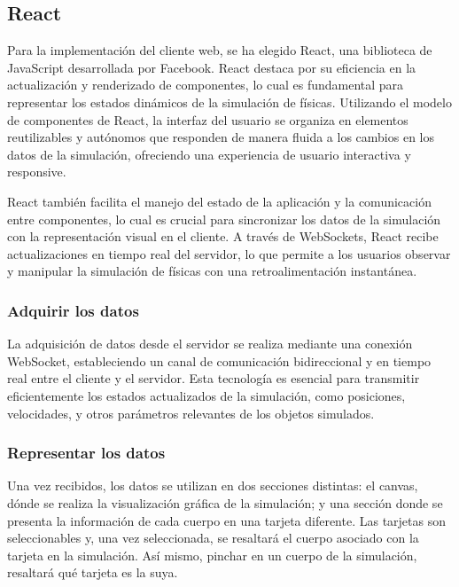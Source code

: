\subsection{React}
Para la implementación del cliente web, se ha elegido React, una biblioteca de JavaScript desarrollada por Facebook. React destaca por su eficiencia en la actualización y renderizado de componentes, lo cual es fundamental para representar los estados dinámicos de la simulación de físicas. Utilizando el modelo de componentes de React, la interfaz del usuario se organiza en elementos reutilizables y autónomos que responden de manera fluida a los cambios en los datos de la simulación, ofreciendo una experiencia de usuario interactiva y responsive.

React también facilita el manejo del estado de la aplicación y la comunicación entre componentes, lo cual es crucial para sincronizar los datos de la simulación con la representación visual en el cliente. A través de WebSockets, React recibe actualizaciones en tiempo real del servidor, lo que permite a los usuarios observar y manipular la simulación de físicas con una retroalimentación instantánea.

\subsubsection{Adquirir los datos}
La adquisición de datos desde el servidor se realiza mediante una conexión WebSocket, estableciendo un canal de comunicación bidireccional y en tiempo real entre el cliente y el servidor. Esta tecnología es esencial para transmitir eficientemente los estados actualizados de la simulación, como posiciones, velocidades, y otros parámetros relevantes de los objetos simulados.

\subsubsection{Representar los datos}
Una vez recibidos, los datos se utilizan en dos secciones distintas: el canvas, dónde se realiza la visualización gráfica de la simulación; y una sección donde se presenta la información de cada cuerpo en una tarjeta diferente. Las tarjetas son seleccionables y, una vez seleccionada, se resaltará el cuerpo asociado con la tarjeta en la simulación. Así mismo, pinchar en un cuerpo de la simulación, resaltará qué tarjeta es la suya. 
